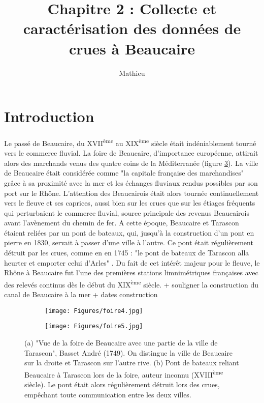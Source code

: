 \documentclass[11pt]{article}
\title{Chapitre 2 : Collecte et caractérisation des données de crues à Beaucaire}
\author{Mathieu}
\begin{document}
\maketitle


\tableofcontents

\section{Introduction}

\paragraph{} Le passé de Beaucaire, du XVII\textsuperscript{ème} au XIX\textsuperscript{ème} siècle était indéniablement tourné vers le commerce fluvial. La foire de Beaucaire, d'importance européenne, attirait alors des marchands venus des quatre coins de la Méditerranée (figure \ref{fig:foire}). La ville de Beaucaire était considérée comme "la capitale française des marchandises" \citep{leon_vie_1953} grâce à sa proximité avec la mer et les échanges fluviaux rendus possibles par son port sur le Rhône. L'attention des Beaucairois était alors tournée continuellement vers le fleuve et ses caprices, aussi bien sur les crues que sur les étiages fréquents qui perturbaient le commerce fluvial, source principale des revenus Beaucairois avant l'avènement du chemin de fer. A cette époque, Beaucaire et Tarascon étaient reliées par un pont de bateaux, qui, jusqu'à la construction d'un pont en pierre en 1830, servait à passer d'une ville à l'autre. Ce pont était régulièrement détruit par les crues, comme en en 1745 : "le pont de bateaux de Tarascon alla heurter et emporter celui d'Arles" \citep{anibert_annales_1764}. Du fait de cet intérêt majeur pour le fleuve, le Rhône à Beaucaire fut l'une des premières stations limnimétriques françaises avec des relevés continus dès le début du XIX\textsuperscript{ème} siècle. + souligner la construction du canal de Beaucaire à la mer + dates construction

\begin{figure}[h]
		\centering
            \begin{subfigure}{0.49\linewidth}
            \centering
            	\texttt{[image: Figures/foire4.jpg]}\hfill
            	\caption{}
            	\label{subfig:foire1}
            \end{subfigure}
            \begin{subfigure}{0.49\linewidth}
            \centering
            	\texttt{[image: Figures/foire5.jpg]}
            	\caption{}
           		\label{subfig:foire2}
            \end{subfigure}
\caption{(a) "Vue de la foire de Beaucaire avec une partie de la ville de Tarascon", Basset André (1749). On distingue la ville de Beaucaire sur la droite et Tarascon sur l'autre rive. 
(b) Pont de bateaux reliant Beaucaire à Tarascon lors de la foire, auteur inconnu (XVIII\textsuperscript{ème} siècle). Le pont était alors régulièrement détruit lors des crues, empêchant toute communication entre les deux villes.}
\label{fig:foire}
\end{figure}
\end{document}
